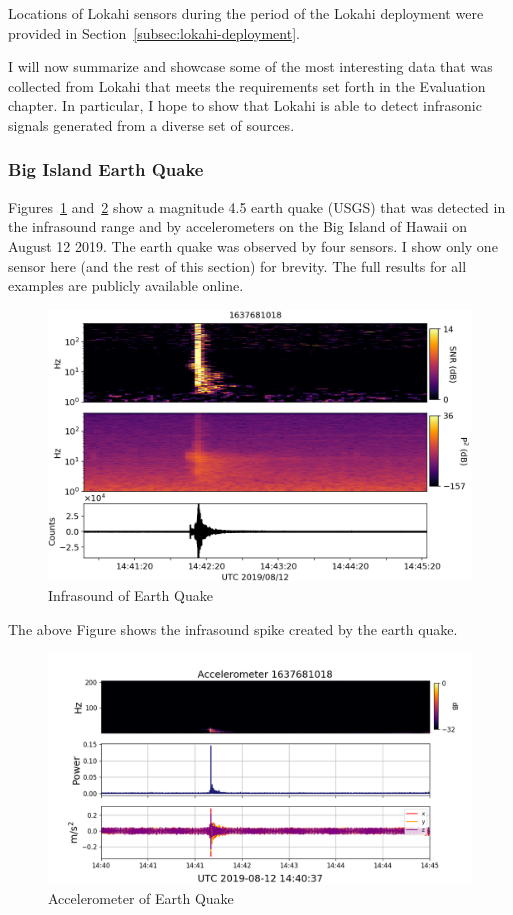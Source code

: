 Locations of Lokahi sensors during the period of the Lokahi deployment were provided in Section~\ref{subsec:lokahi-deployment}.

I will now summarize and showcase some of the most interesting data that was collected from Lokahi that meets the requirements set forth in the Evaluation chapter. In particular, I hope to show that Lokahi is able to detect infrasonic signals generated from a diverse set of sources.


\subsubsection{Big Island Earth Quake}
Figures~\ref{fig:quake_1} and~\ref{fig:quake_2} show a magnitude 4.5 earth quake (USGS\cite{usgs_quake}) that was detected in the infrasound range and by accelerometers on the Big Island of Hawaii on August 12 2019. The earth quake was observed by four sensors. I show only one sensor here (and the rest of this section) for brevity. The full results for all examples are publicly available online\cite{redvox_reports}.

\begin{figure}[H]
    \centering
    \includegraphics[width=\linewidth]{figures/quake_1.png}
    \caption{Infrasound of Earth Quake}
    \label{fig:quake_1}
\end{figure}

The above Figure shows the infrasound spike created by the earth quake.

\begin{figure}[H]
    \centering
    \includegraphics[width=\linewidth]{figures/quake_2.png}
    \caption{Accelerometer of Earth Quake}
    \label{fig:quake_2}
\end{figure}

